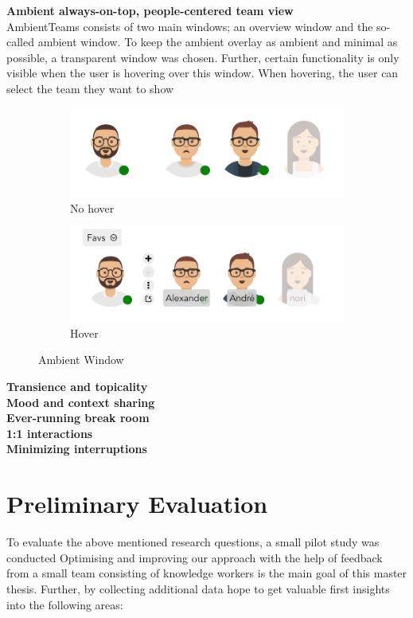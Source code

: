 \medskip\noindent\textbf{Ambient always-on-top, people-centered team view} \\
AmbientTeams consists of two main windows; an overview window and the so-called ambient window. To keep the ambient overlay as ambient and minimal as possible, a transparent window was chosen. Further, certain functionality is only visible when the user is hovering over this window. When hovering, the user can select the team they want to show

\begin{figure}[h]
    \centering
    \begin{subfigure}{.5\textwidth}
        \centering
        \includegraphics[width=.8\linewidth]{./images/AT_no_hover.png}
        \caption{No hover }
        \label{fig:at_no_hover}
    \end{subfigure}%
    \begin{subfigure}{.5\textwidth}
        \centering
        \includegraphics[width=.8\linewidth]{./images/AT_hover.png}
        \caption{Hover }
        \label{fig:at_hover}
    \end{subfigure}
    \caption{Ambient Window}
\end{figure}

\medskip\noindent\textbf{Transience and topicality} \\
\medskip\noindent\textbf{Mood and context sharing} \\
\medskip\noindent\textbf{Ever-running break room} \\
\medskip\noindent\textbf{1:1 interactions} \\
\medskip\noindent\textbf{Minimizing interruptions} \\

\chapter{Preliminary Evaluation}
To evaluate the above mentioned research questions, a small pilot study was conducted Optimising and improving our approach with the help of feedback from a small team consisting of knowledge workers is the main goal of this master thesis. Further, by collecting additional data hope to get valuable first insights into the following areas:

